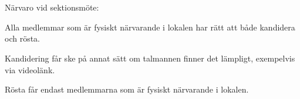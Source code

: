 \documentclass[10pt]{article}
\begin{document}
\section*{\doctitle}
Närvaro vid sektionsmöte:
\begin{dashlist}
\item Alla medlemmar som är fysiskt närvarande i lokalen har rätt att både kandidera och rösta.
\item Kandidering får ske på annat sätt om talmannen finner det lämpligt, exempelvis via videolänk.
\item Rösta får endast medlemmarna som är fysiskt närvarande i lokalen.
\end{dashlist}
\end{document}
